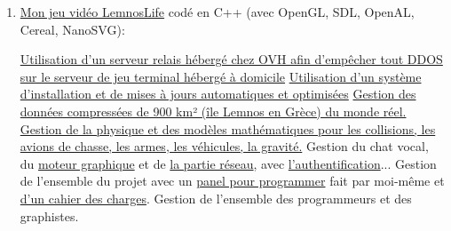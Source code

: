 \documentclass{article}
\begin{document}
		\begin{enumerate}

			\item \href{https://github.com/Benjamin-Loison/LemnosLife}{Mon jeu vidéo LemnosLife} codé en C++ (avec OpenGL, SDL, OpenAL, Cereal, NanoSVG):

				\subitem \href{https://github.com/Benjamin-Loison/LemnosLife/tree/master/ServerBridge}{Utilisation d'un serveur relais hébergé chez OVH afin d'empêcher tout DDOS sur le serveur de jeu terminal hébergé à domicile}
				\subitem \href{https://github.com/Benjamin-Loison/LemnosLife/tree/master/Installation}{Utilisation d'un système d'installation et de mises à jours automatiques et optimisées}
				\subitem \href{https://github.com/Benjamin-Loison/LemnosLife/tree/master/Client/LemnosLife/Map}{Gestion des données compressées de 900 km² (île Lemnos en Grèce) du monde réel.}
				\subitem \href{https://github.com/Benjamin-Loison/LemnosLife/tree/master/LaTex/Theory}{Gestion de la physique et des modèles mathématiques pour les collisions, les avions de chasse, les armes, les véhicules, la gravité.}
				\subitem Gestion du chat vocal, du \href{https://github.com/Benjamin-Loison/LemnosLife/tree/master/Client/LemnosLife/Render}{moteur graphique} et de \href{https://github.com/Benjamin-Loison/LemnosLife/blob/master/Client/Network/Main/client.h}{la partie réseau}, avec \href{https://github.com/Benjamin-Loison/Lot-of-Java-projects/tree/master/ServeurAuth}{l'authentification}...
				\subitem Gestion de l'ensemble du projet avec un \href{https://github.com/Benjamin-Loison/LemnosLife/tree/master/Panel}{panel pour programmer} fait par moi-même et \href{https://docs.google.com/document/d/1rnYh5uGzhmrSZ34OW5-3V3XZjxATDYzPypT43C2trjE}{d'un cahier des charges}.
				\subitem Gestion de l'ensemble des programmeurs et des graphistes.


\end{enumerate}
\end{document}
